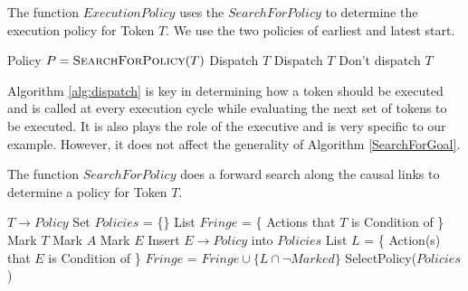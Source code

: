 
\begin{algorithm} [H]
  \caption{\small The function $ExecutionPolicy$ uses the $SearchForPolicy$ to 
   determine the execution policy for Token $T$. We use the two policies of earliest and latest start.}
  \label{alg:dispatch}
\label{ExecutionPolicy}
\begin{algorithmic}
\small 
{}
\State Policy $P = \textsc{SearchForPolicy}( T )$
	\State \Return Dispatch $T$
	\State \Return Dispatch $T$
\Else
	\State \Return Don't dispatch $T$
\EndIf
\EndFunction
\end{algorithmic}
\end{algorithm}

Algorithm \ref{alg:dispatch} is key in determining how a token should
be executed and is called at every execution cycle while evaluating
the next set of tokens to be executed. It is also plays the role of the executive 
and is very specific to our example. However, it does not affect the generality
of Algorithm \ref{SearchForGoal}.


\begin{algorithm} [htb]
  \caption{\small The function $SearchForPolicy$ does a forward search
    along the causal links to determine a policy for Token $T$.}
  \label{SearchForGoal}
\begin{algorithmic}
  \small
  \State \Return $T \to Policy$
  \Else 
  \State Set $Policies$ = \{\}
  \State List $Fringe$ = \{ Actions that $T$ is Condition of \}
  \State Mark $T$
  \State Mark $A$
  \State Mark $E$
  \State Insert $E \to Policy$ into $Policies$
  \EndIf
  \State List $L$ = \{ Action(s) that $E$ is Condition of \}
  \State $Fringe$ = $Fringe \cup \{L \cap \neg Marked \}$ 
  \EndFor
  \EndFor
  \EndIf
  \State \Return SelectPolicy($Policies$)
\EndFunction
\end{algorithmic}
\end{algorithm}


